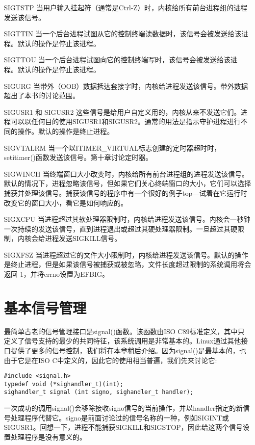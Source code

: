\begin{eqlist*}
\item[SIGTSTP] 当用户输入挂起符（通常是Ctrl-Z）时，内核给所有前台进程组的进程发送该信号。
\item[SIGTTIN] 当一个后台进程试图从它的控制终端读数据时，该信号会被发送给该进程。默认的操作是停止该进程。
\item[SIGTTOU] 当一个后台进程试图向它的控制终端写时，该信号会被发送给该进程。默认的操作是停止该进程。
\item[SIGURG] 当带外（OOB）数据抵达套接字时，内核给进程发送该信号。带外数据超出了本书的讨论范围。
\item[SIGUSR1 和 SIGUSR2]
 这些信号是给用户自定义用的，内核从来不发送它们。进程可以以任何目的使用SIGUSR1和SIGUSR2。通常的用法是指示守护进程进行不同的操作。默认的操作是终止进程。
\item[SIGVTALRM] 当一个以ITIMER\_VIRTUAL标志创建的定时器超时时，setitimer()函数发送该信号。第十章讨论定时器。
\item[SIGWINCH] 当终端窗口大小改变时，内核给所有前台进程组的进程发送该信号。默认的情况下，进程忽略该信号，但如果它们关心终端窗口的大小，它们可以选择捕获并处理该信号。捕获该信号的程序中有一个很好的例子top---试着在它运行时改变它的窗口大小，看它是如何响应的。
\item[SIGXCPU] 当进程超过其软处理器限制时，内核给进程发送该信号。内核会一秒钟一次持续的发送该信号，直到进程退出或超过其硬处理器限制。一旦超过其硬限制，内核会给进程发送SIGKILL信号。
\item[SIGXFSZ] 当进程超过它的文件大小限制时，内核给进程发送该信号。默认的操作是终止进程，但是如果该信号被捕获或被忽略，文件长度超过限制的系统调用将会返回-1，并将errno设置为EFBIG。
\end{eqlist*}

\section{基本信号管理}

最简单古老的信号管理接口是signal()函数。该函数由ISO C89标准定义，其中只定义了信号支持的最少的共同特征，该系统调用是非常基本的。Linux通过其他接口提供了更多的信号控制，我们将在本章稍后介绍。因为signal()是最基本的，也由于它是在ISO C中定义的，因此它的使用相当普遍，我们先来讨论它:

\begin{lstlisting}
#include <signal.h>
typedef void (*sighandler_t)(int);
sighandler_t signal (int signo, sighandler_t handler);
\end{lstlisting}

一次成功的调用signal()会移除接收signo信号的当前操作，并以handler指定的新信号处理程序代替它。signo是前面讨论过的信号名称的一种，例如SIGINT或SIGUSR1。回想一下，进程不能捕获SIGKILL和SIGSTOP，因此给这两个信号设置处理程序是没有意义的。

